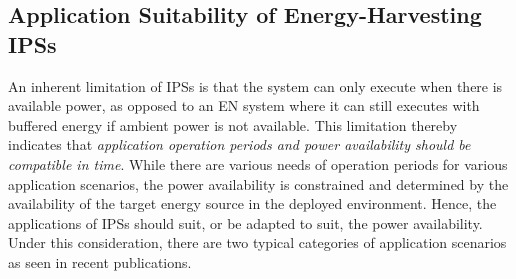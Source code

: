 

\subsection{Application Suitability of Energy-Harvesting IPSs}

An inherent limitation of IPSs is that the system can only execute when there is available power, as opposed to an EN system where it can still executes with buffered energy if ambient power is not available. 
This limitation thereby indicates that \textit{application operation periods and power availability should be compatible in time}. 
While there are various needs of operation periods for various application scenarios, the power availability is constrained and determined by the availability of the target energy source in the deployed environment. 
Hence, the applications of IPSs should suit, or be adapted to suit, the power availability. 
Under this consideration, there are two typical categories of application scenarios as seen in recent publications. 

